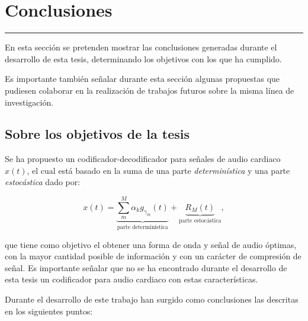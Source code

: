 
\chapter{Conclusiones}\label{capit:cap7}
\vspace{-2.0325ex}%
\noindent
\rule{\textwidth}{0.5pt}
\vspace{-5.5ex}%
\newcommand{\pushline}{\Indp}%

En esta sección se pretenden mostrar las conclusiones generadas durante el desarrollo de esta tesis, determinando los objetivos con los que ha cumplido. 

Es importante también señalar durante esta sección algunas propuestas que pudiesen colaborar en la realización de trabajos futuros sobre la misma línea de investigación.

\section{Sobre los objetivos de la tesis}
Se ha propuesto un codificador-decodificador para señales de audio cardiaco $x(t)$, el cual está basado en la suma de una parte \emph{determinística} y una parte \emph{estocástica} dado por:

\[
 x(t) = \underbrace{\sum_{m}^M \alpha_{k}g_{\gamma_{m}}(t)}_{\text{parte determinística}} + \underbrace{R_{M}(t)}_{\text{parte estocástica}},
\]

que tiene como objetivo el obtener una forma de onda y señal de audio óptimas, con la mayor cantidad posible de información y con un carácter de compresión de señal. Es importante señalar que no se ha encontrado durante el desarrollo de esta tesis un codificador para audio cardiaco con estas características.

Durante el desarrollo de este trabajo han surgido como conclusiones las descritas en los siguientes puntos:

